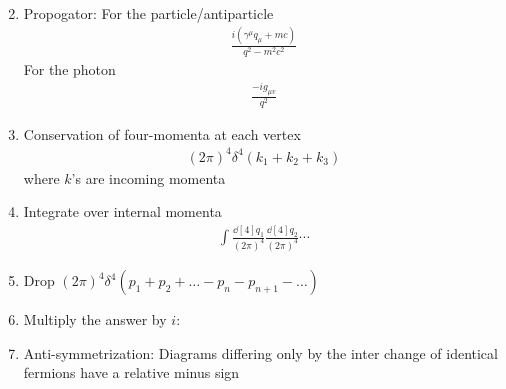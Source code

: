 \documentclass[../main.tex]{subfiles}
\begin{document}
\begin{enumerate}
\begin{align*}
    \end{align*}
    \item Propogator: For the particle/antiparticle
    \begin{align*}
        \frac{i(\gamma^\mu q_\mu + mc)}{q^2 - m^2 c^2}
    \end{align*}
    For the photon
    \begin{align*}
        \frac{-i g_{\mu v}}{q^2}
    \end{align*}
    \item Conservation of four-momenta at each vertex
    \begin{align*}
        (2\pi)^4 \delta^4(k_1 + k_2 + k_3)
    \end{align*}
    where $k$'s are incoming momenta
    \item Integrate over internal momenta
    \begin{align*}
        \int \frac{\dd[4]{q_1}}{(2\pi)^4} \frac{\dd[4]{q_2}}{(2\pi)^4} \cdots
    \end{align*}
    \item Drop $(2\pi)^4 \delta^4(p_1 + p_2 + \dots - p_n - p_{n +1} - \dots)$
    \item Multiply the answer by $i$:
    \item Anti-symmetrization: Diagrams differing only by the inter change of identical fermions
    have a relative minus sign
\end{enumerate}
\end{document}
